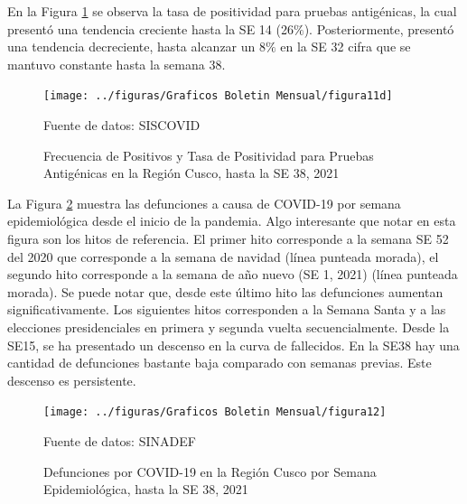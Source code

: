 \documentclass[12pt,a4paper,openany]{book}
\begin{document}
	En la Figura \ref{fig:positivos_antigenicas} se observa la tasa de positividad para pruebas antigénicas, la cual presentó una tendencia creciente hasta la SE 14 (26$\%$). Posteriormente, presentó una tendencia decreciente, hasta alcanzar un 8$\%$ en la SE 32 cifra que se mantuvo constante hasta la semana 38.	
	\begin{figure}[h]
	\caption{Frecuencia de Positivos y Tasa de Positividad para Pruebas Antigénicas en la Región Cusco, hasta la SE 38, 2021}\label{fig:positivos_antigenicas}
	\begin{center}
		\texttt{[image: ../figuras/Graficos Boletin Mensual/figura11d]}
	\end{center}
	{\footnotesize {Fuente de datos: SISCOVID}}
	\end{figure}
\clearpage
	La Figura \ref{fig:defunciones_semanal} muestra las defunciones a causa de COVID-19 por semana epidemiológica desde el inicio de la pandemia. Algo interesante que notar en esta figura son los hitos de referencia. El primer hito corresponde a la semana SE 52 del 2020 que corresponde a la semana de navidad (línea punteada morada), el segundo hito corresponde a la semana de año nuevo (SE 1, 2021) (línea punteada morada). Se puede notar que, desde este último hito las defunciones aumentan significativamente. Los siguientes hitos corresponden a la Semana Santa y a las elecciones presidenciales en primera y segunda vuelta secuencialmente. Desde la SE15, se ha presentado un descenso en la curva de fallecidos. En la SE38 hay una cantidad de defunciones bastante baja comparado con semanas previas. Este descenso es persistente.

	\begin{figure}[h]
	\caption{Defunciones por COVID-19 en la Región Cusco por Semana Epidemiológica, hasta la SE 38, 2021}\label{fig:defunciones_semanal}
	\begin{center}
		\texttt{[image: ../figuras/Graficos Boletin Mensual/figura12]}
	\end{center}
	{\footnotesize {Fuente de datos: SINADEF}}
	\end{figure}
\end{document}

